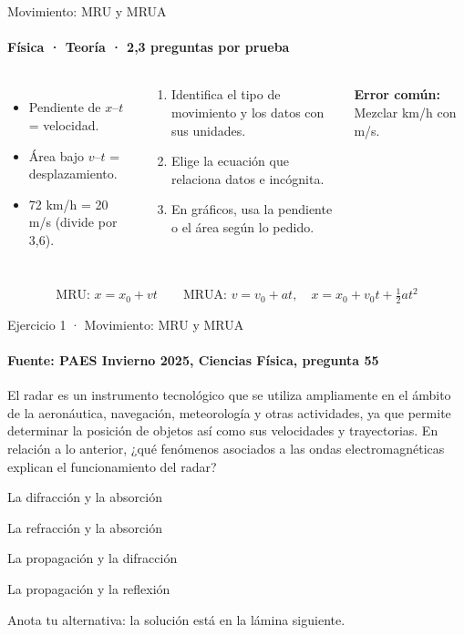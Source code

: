 \documentclass[aspectratio=169,11pt]{beamer}
\newcommand{\alternativa}[2]{\begin{opcion}\tecla{#1}\hspace{0.6em}#2\end{opcion}}
\newlength{\ajustealto}
\newenvironment{ajustar}[1][0.74\textheight]
  {\setlength{\ajustealto}{#1}\begin{lrbox}{\ajustecaja}\begin{minipage}{\textwidth}}
  {\end{minipage}\end{lrbox}%
   \ifdim\dimexpr\ht\ajustecaja+\dp\ajustecaja\relax>\ajustealto
     \resizebox*{!}{\ajustealto}{\usebox{\ajustecaja}}\else\usebox{\ajustecaja}\fi}
\begin{document}
\begin{frame}{Movimiento: MRU y MRUA}
\label{tema-cs-cinematica}
\framesubtitle{Física · Teoría · 2,3 preguntas por prueba}
\begin{ajustar}
\begin{columns}[T,onlytextwidth]
\begin{itemize}\footnotesize
\item Pendiente de $x$–$t$ = velocidad.
\item Área bajo $v$–$t$ = desplazamiento.
\item 72 km/h = 20 m/s (divide por 3,6).
\end{itemize}
\begin{cajaregla}\scriptsize \begin{enumerate}\item Identifica el tipo de movimiento y los datos con sus unidades.\item Elige la ecuación que relaciona datos e incógnita.\item En gráficos, usa la pendiente o el área según lo pedido.\end{enumerate}\end{cajaregla}
\begin{notagris}\scriptsize \textbf{Error común:} Mezclar km/h con m/s.\end{notagris}
\end{columns}
\begin{cajaclave}[Ecuaciones]\footnotesize
\[\text{MRU: } x=x_0+vt \quad\quad \text{MRUA: } v=v_0+at,\quad x=x_0+v_0t+\tfrac{1}{2}at^2\]
\end{cajaclave}
\end{ajustar}
\end{frame}

\begin{frame}{Ejercicio 1 · Movimiento: MRU y MRUA}
\framesubtitle{Fuente: PAES Invierno 2025, Ciencias Física, pregunta 55}
\begin{ajustar}[0.7\textheight]
{\small El radar es un instrumento tecnológico que se utiliza ampliamente en el ámbito de la aeronáutica, navegación, meteorología y otras actividades, ya que permite determinar la posición de objetos así como sus velocidades y trayectorias. En relación a lo anterior, ¿qué fenómenos asociados a las ondas electromagnéticas explican el funcionamiento del radar?}
\vspace{0.4em}
\alternativa{A}{La difracción y la absorción}
\alternativa{B}{La refracción y la absorción}
\alternativa{C}{La propagación y la difracción}
\alternativa{D}{La propagación y la reflexión}
\end{ajustar}
\vfill{\tiny\color{zinc500}\hfill Anota tu alternativa: la solución está en la lámina siguiente.}
\end{frame}
\end{document}
